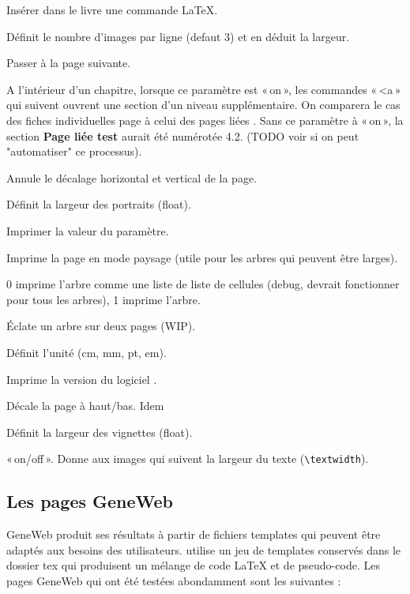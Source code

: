 \begin{description}[style=nextline]
\item[LaTeX] Insérer dans le livre une commande \LaTeX{}.
\item[NbImgPerLine] Définit le nombre d'images par ligne (defaut 3) et en
déduit la largeur.
\item[Newpage] Passer à la page suivante.
\item[NewLevel] A l'intérieur d'un chapitre, lorsque ce paramètre est «\,on\,»,
les commandes «\,<a\,» qui suivent ouvrent une section d'un niveau
supplémentaire. On comparera le cas des fiches individuelles
page \pageref{fiches} à celui des pages liées \pageref{pageliee}.
Sans ce paramètre à «\,on\,», la section {\bf Page liée test} aurait été
numérotée 4.2. (TODO voir si on peut "automatiser" ce processus).
\item[OffsetOff] Annule le décalage horizontal et vertical de la page.
\item[PortraitWidth] Définit la largeur des portraits (float).
\item[Print] Imprimer la valeur du paramètre.
\item[Sideways] Imprime la page en mode paysage (utile pour les arbres
qui peuvent être larges).\label{sideways}
\item[TreeMode] 0 imprime l'arbre comme une liste de liste de cellules
(debug, devrait fonctionner pour tous les arbres), 1 imprime l'arbre.
\item[TwoPages] Éclate un arbre sur deux pages (WIP).
\item[Unit] Définit l'unité (cm, mm, pt, em).
\item[Version] Imprime la version du logiciel \gwtol{}.
\item[Voffset] Décale la page à haut/bas. Idem
\item[VignWidth] Définit la largeur des vignettes (float).
\item[WideImages] «\,on/off\,». Donne aux images qui suivent la largeur du texte
(\verb|\textwidth|).

\end{description}

\subsection{Les pages GeneWeb}

GeneWeb produit ses résultats à partir de fichiers templates qui peuvent être
adaptés aux besoins des utilisateurs.
\gwtol{} utilise un jeu de templates conservés dans le dossier tex qui
produisent un mélange de code \LaTeX{} et de pseudo-code.
Les pages GeneWeb qui ont été testées abondamment sont les suivantes :

